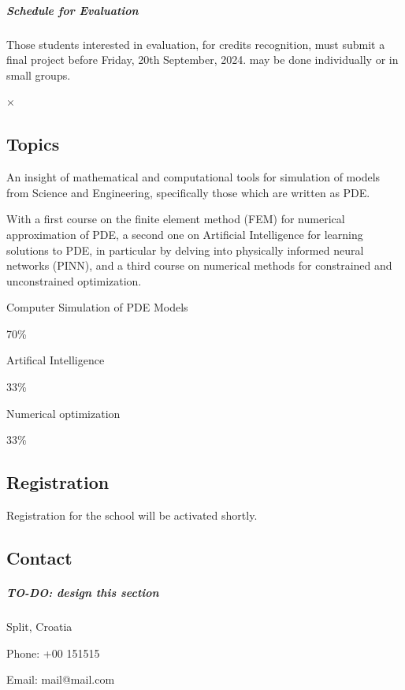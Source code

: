 \documentclass[
]{article}
\begin{document}
\hypertarget{schedule-for-evaluation}{%
\subparagraph{Schedule for Evaluation}\label{schedule-for-evaluation}}

Those students interested in evaluation, for credits recognition, must
submit a final project before Friday, 20th September, 2024. may be done
individually or in small groups.

\hypertarget{modal01}{}
{×}

\hypertarget{topics}{%
\subsection{Topics}\label{topics}}

An insight of mathematical and computational tools for simulation of
models from Science and Engineering, specifically those which are
written as PDE.

With a first course on the finite element method (FEM) for numerical
approximation of PDE, a second one on Artificial Intelligence for
learning solutions to PDE, in particular by delving into physically
informed neural networks (PINN), and a third course on numerical methods
for constrained and unconstrained optimization.

\emph{}Computer Simulation of PDE Models

70\%

\emph{}Artifical Intelligence

33\%

\emph{}Numerical optimization

33\%

\hypertarget{registration}{%
\subsection{Registration}\label{registration}}

Registration for the school will be activated shortly.

\hypertarget{contact}{%
\subsection{Contact}\label{contact}}

\hypertarget{to-do-design-this-section}{%
\subparagraph{\texorpdfstring{\textbf{TO-DO: design this
section}}{TO-DO: design this section}}\label{to-do-design-this-section}}

\emph{} Split, Croatia

\emph{} Phone: +00 151515

\emph{} Email: mail@mail.com
\end{document}

